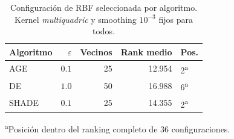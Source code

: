 \begin{table}[H]
    \centering
    \small
    \setlength{\tabcolsep}{5pt}
    \begin{tabular}{lrrrl}
        \toprule
        \textbf{Algoritmo} & \textbf{$\varepsilon$} & \textbf{Vecinos} & \textbf{Rank medio} & \textbf{Pos.}        \\
        \midrule
        AGE                & $0.1$                  & 25               & 12.954              & 2\textsuperscript{a} \\
        DE                 & $1.0$                  & 50               & 16.988              & 6\textsuperscript{a} \\
        SHADE              & $0.1$                  & 25               & 14.355              & 2\textsuperscript{a} \\
        \bottomrule
    \end{tabular}
    \footnotesize\textsuperscript{a}Posición dentro del ranking completo de 36 configuraciones.
    \caption{Configuración de RBF seleccionada por algoritmo. Kernel \textit{multiquadric} y smoothing $10^{-3}$ fijos para todos.}
    \label{tab:rbf_seleccion_final}
\end{table}
